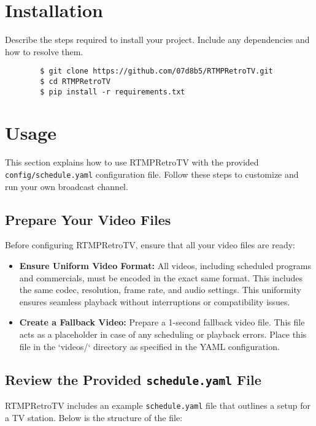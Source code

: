 \documentclass{article}
\begin{document}
	\section{Installation}
	Describe the steps required to install your project. Include any dependencies and how to resolve them.
	
	\begin{verbatim}
		$ git clone https://github.com/07d8b5/RTMPRetroTV.git
		$ cd RTMPRetroTV
		$ pip install -r requirements.txt
	\end{verbatim}
	
	\section{Usage}
	
	This section explains how to use RTMPRetroTV with the provided \texttt{config/schedule.yaml} configuration file. Follow these steps to customize and run your own broadcast channel.
	
	\subsection{Prepare Your Video Files}
	
	Before configuring RTMPRetroTV, ensure that all your video files are ready:
	
	\begin{itemize}
		\item \textbf{Ensure Uniform Video Format:} All videos, including scheduled programs and commercials, must be encoded in the exact same format. This includes the same codec, resolution, frame rate, and audio settings. This uniformity ensures seamless playback without interruptions or compatibility issues.
		
		\item \textbf{Create a Fallback Video:} Prepare a 1-second fallback video file. This file acts as a placeholder in case of any scheduling or playback errors. Place this file in the `videos/` directory as specified in the YAML configuration.
	\end{itemize}
	
	\subsection{Review the Provided \texttt{schedule.yaml} File}
	
	RTMPRetroTV includes an example \texttt{schedule.yaml} file that outlines a setup for a TV station. Below is the structure of the file:
	
\end{document}

